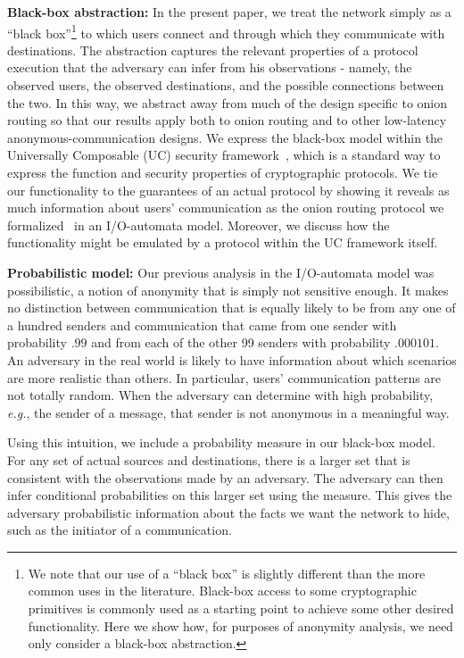 \documentclass[prodmode,acmtissec]{acmsmall}
\begin{document}
{\bf Black-box abstraction:}
In the present paper, we treat the network simply as a ``black box''\footnote{We note that our use of a ``black box'' is slightly different than the more common uses in the literature. Black-box access to some cryptographic primitives is commonly used as a starting point to achieve some other desired functionality. Here we show how, for purposes of anonymity analysis, we need only consider a black-box abstraction.} to which users connect and
through which they communicate with destinations.  The abstraction
captures the relevant properties of a protocol execution that the
adversary can infer from his observations - namely, the observed
users, the observed destinations, and the possible connections between
the two.  In this way, we abstract away from much of the design
specific to onion routing so that our results apply both to onion
routing and to other low-latency anonymous-communication designs. 
We express the black-box model within the Universally Composable (UC) security
framework~\cite{cryptoeprint:2000:067}, which is a standard way to express the  
function and security properties of cryptographic protocols. We tie our functionality to 
the guarantees of an actual protocol by showing it reveals as much information about users' 
communication as the onion routing protocol we formalized~\cite{FC07} in an I/O-automata model. Moreover, we discuss how the functionality might be emulated by a protocol within the UC framework itself.

{\bf Probabilistic model:}
Our previous analysis in the I/O-automata model was possibilistic, a
notion of anonymity that is simply not sensitive enough. It makes no
distinction between communication that is equally likely to be from
any one of a hundred senders and communication that came from one
sender with probability $.99$ and from each of the other 99 senders
with probability $.000101$.  An adversary in the real world is likely
to have information about which scenarios are more realistic than
others.  In particular, users' communication patterns are not totally
random.  When the adversary can determine with high probability,
\emph{e.g.}, the sender of a message, that sender is not anonymous in
a meaningful way.

Using this intuition, we include a probability measure in our black-box model.  For any set of actual sources and destinations, there is a larger set that is consistent with the observations made by an adversary.  The adversary can then infer conditional probabilities on this larger set using the measure.  This gives the adversary probabilistic information about the facts we want the network to hide, such as the initiator of a communication.
\end{document}
